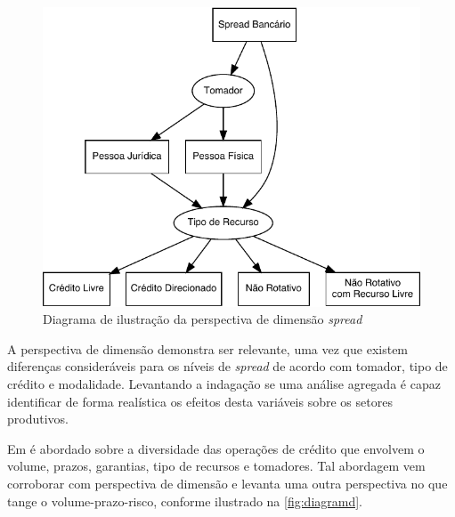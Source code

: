 \documentclass[
  12pt,
  12pt,
  openright,
  oneside,
  a4paper,
  chapter=TITLE,
  section=TITLE,
  subsection=TITLE,
  subsubsection=TITLE,
  portugues,
  sumario=tradicional]{abntex2}
\begin{document}
\begin{figure}[!htbp]
\vspace{20pt}
\caption{Diagrama de ilustração da perspectiva de dimensão  \emph{spread}}
\vspace{-4mm}

\begin{center}\includegraphics{12-exportedfigures/diagram.spread.dim-1} \end{center}
\vspace{-3mm}
\label{fig:diagramc}
\vspace{-2mm}
\end{figure}

A perspectiva de dimensão demonstra ser relevante, uma vez que existem diferenças consideráveis para os níveis de \emph{spread} de acordo com tomador, tipo de crédito e modalidade. Levantando a indagação se uma análise agregada é capaz identificar de forma realística os efeitos desta variáveis sobre os setores produtivos.

Em \textcite{BCB:1999} é abordado sobre a diversidade das operações de crédito que envolvem o volume, prazos, garantias, tipo de recursos e tomadores. Tal abordagem vem corroborar com perspectiva de dimensão e levanta uma outra perspectiva no que tange o volume-prazo-risco, conforme ilustrado na \autoref{fig:diagramd}.
\end{document}
